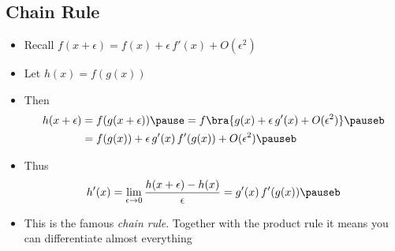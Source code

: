 \begin{slide}
\section[-2]{Chain Rule}

\begin{PauseHighLight}
  \begin{itemize}
  \item Recall $f(x+\epsilon) = f(x) + \epsilon\, f'(x) + O(\epsilon^2)$
  \item Let $h(x) = f(g(x))$\pause
  \item Then
    \begin{align*}
      h(x+\epsilon) &= f(g(x+\epsilon)) \pause= f\bra{g(x) + \epsilon\,g'(x) +
                      O(\epsilon^2)}\pauseb\\
      &= f(g(x)) + \epsilon\, g'(x)\, f'(g(x)) + O(\epsilon^2)\pauseb
    \end{align*}
  \item Thus
    \begin{align*}
      h'(x) =  \lim_{\epsilon\rightarrow 0} \frac{h(x+\epsilon)  -
      h(x)}{\epsilon} = g'(x)\, f'(g(x)) \pauseb
    \end{align*}
  \item This is the famous \emph{chain rule}\pauseb. Together with the
    product rule it means you can differentiate almost everything\pauseb
  \end{itemize}
\end{PauseHighLight}

\end{slide}



